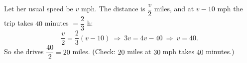 Let her usual speed be $v$ mph. The distance is $\dfrac {v}{2}$ miles, and at $v-10$ mph the trip takes $40$ minutes $=\dfrac{2}{3}$ h:
\[
\dfrac {v}{2}=\dfrac{2}{3}(v-10)\ \Longrightarrow\ 3v=4v-40\ \Longrightarrow\ v=40 .
\]
So she drives $\dfrac{40}{2}=\boxed{20}$ miles. (Check: $20$ miles at $30$ mph takes $40$ minutes.)
